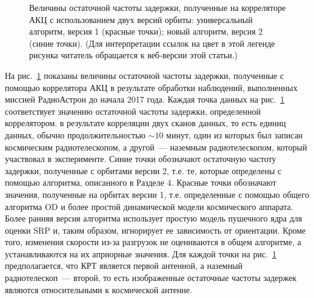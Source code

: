 \begin{figure}
 \caption{Величины остаточной частоты задержки, полученные на корреляторе АКЦ с
использованием двух версий орбиты: универсальный алгоритм, версия 1 (красные точки); новый алгоритм,
версия 2 (синие точки). (Для интерпретации ссылок на цвет в этой легенде рисунка читатель обращается
к веб-версии этой статьи.)}
 \label{fig:rates_v1v2}
\end{figure}

На рис.~\ref{fig:rates_v1v2} показаны величины остаточной частоты задержки, полученные с помощью
коррелятора АКЦ в результате обработки наблюдений, выполненных миссией РадиоАстрон до начала 2017
года. Каждая точка данных на рис.~\ref{fig:rates_v1v2} соответствует значению остаточной частоты
задержки, определенной коррелятором. в результате корреляции двух сканов данных, то есть единиц
данных, обычно продолжительностью $\sim10$ минут, один из которых был записан космическим
радиотелескопом, а другой~--- наземным радиотелескопом, который участвовал в эксперименте. Синие
точки обозначают остаточную частоту задержки, полученные с орбитами версии 2, т.е. те, которые
определены с помощью алгоритма, описанного в Разделе 4. Красные точки обозначают значения,
полученные на орбитах версии 1, т.е. определенные с помощью общего алгоритма OD и более простой
динамической модели космического аппарата. Более ранняя версия алгоритма использует простую модель
пушечного ядра для оценки SRP и, таким образом, игнорирует ее зависимость от ориентации. Кроме того,
изменения скорости из-за разгрузок не оцениваются в общем алгоритме, а устанавливаются на их
априорные значения. Для каждой точки на рис.~\ref{fig:rates_v1v2} предполагается, что КРТ является
первой антенной, а наземный радиотелескоп~--- второй, то есть изображенные остаточные частоты
задержек являются относительными к космической антенне.

